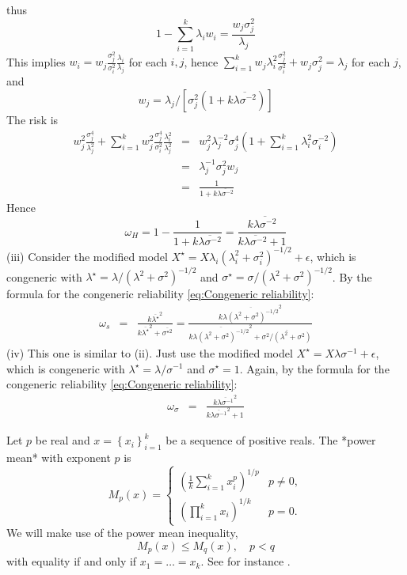 \documentclass{article}
\makeatletter
\theoremstyle{plain}
\theoremstyle{plain}
\theoremstyle{definition}
\theoremstyle{remark}
\theoremstyle{definition}
\theoremstyle{plain}
\theoremstyle{plain}
\theoremstyle{definition}
\newenvironment{proof}[1][\protect\proofname]{\par
	\normalfont\topsep6\p@\@plus6\p@\relax
	\trivlist
	\itemindent\parindent
	\item[\hskip\labelsep\scshape #1]\ignorespaces
}{%
	\endtrivlist\@endpefalse
}
\providecommand{\proofname}{Proof}
\makeatother
\begin{document}
\begin{proof}[Proof of Proposition \ref{prop:Z-reliabiltiy}]
thus 
\[
1-\sum_{i=1}^{k}\lambda_{i}w_{i}=\frac{w_{j}\sigma_{j}^{2}}{\lambda_{j}}
\]
This implies $w_{i}=w_{j}\frac{\sigma_{j}^{2}}{\sigma_{i}^{2}}\frac{\lambda_{i}}{\lambda_{j}}$
for each $i,j$, hence $\sum_{i=1}^{k}w_{j}\lambda_{i}^{2}\frac{\sigma_{j}^{2}}{\sigma_{i}^{2}}+w_{j}\sigma_{j}^{2}=\lambda_{j}$
for each $j$, and
\[
w_{j}=\lambda_{j}/[\sigma_{j}^{2}(1+k\overline{\lambda\sigma^{-2}})]
\]
The risk is
\begin{eqnarray*}
w_{j}^{2}\frac{\sigma_{j}^{4}}{\lambda_{j}^{2}}+\sum_{i=1}^{k}w_{j}^{2}\frac{\sigma_{j}^{4}}{\sigma_{i}^{2}}\frac{\lambda_{i}^{2}}{\lambda_{j}^{2}} & = & w_{j}^{2}\lambda_{j}^{-2}\sigma_{j}^{4}\left(1+\sum_{i=1}^{k}\lambda_{i}^{2}\sigma_{i}^{-2}\right)\\
 & = & \lambda_{j}^{-1}\sigma_{j}^{2}w_{j}\\
 & = & \frac{1}{1+k\overline{\lambda\sigma^{-2}}}
\end{eqnarray*}
Hence
\[
\omega_H = 1 - \frac{1}{1+k\overline{\lambda\sigma^{-2}}} = \frac{k\overline{\lambda\sigma^{-2}}}{k\overline{\lambda\sigma^{-2}}+1}
\]
(iii) Consider the modified
model $X^{\star}=X\lambda_{i}(\lambda_{i}^{2}+\sigma_{i}^{2})^{-1/2}+\epsilon$,
which is congeneric with $\lambda^{\star}=\lambda/(\lambda^{2}+\sigma^{2})^{-1/2}$
and $\sigma^{\star}=\sigma/(\lambda^{2}+\sigma^{2})^{-1/2}$. By the formula for the congeneric reliability \eqref{eq:Congeneric reliability}:
\begin{eqnarray*}
\omega_s & = & \frac{k\overline{\lambda^{\star}}^{2}}{k\overline{\lambda^{\star}}^{2}+\overline{\sigma^{\star2}}} = \frac{k\overline{\lambda(\lambda^{2}+\sigma^{2})^{-1/2}}^{2}}{k\overline{\lambda(\lambda^{2}+\sigma^{2})^{-1/2}}^{2}+\overline{\sigma^{2}/(\lambda^{2}+\sigma^{2})}}
\end{eqnarray*}
(iv) This one is similar to (ii). Just use the modified model $X^{\star}=X\lambda\sigma^{-1}+\epsilon$,
which is congeneric with $\lambda^{\star}=\lambda/\sigma^{-1}$ and
$\sigma^{\star}=1$. Again, by the formula for the congeneric reliability \eqref{eq:Congeneric reliability}:
\begin{eqnarray*}
\omega_\sigma & = & \frac{k\overline{\lambda\sigma^{-1}}^{2}}{k\overline{\lambda\sigma^{-1}}^{2}+1}
\end{eqnarray*}
\end{proof}

Let $p$ be real and $x=\left\{ x_{i}\right\} _{i=1}^{k}$ be a sequence
of positive reals. The *power mean* with exponent $p$ is
\[
M_{p}\left(x\right)=\begin{cases}
\left(\frac{1}{k}\sum_{i=1}^{k}x_{i}^{p}\right)^{1/p} & p\neq0,\\
\left(\prod_{i=1}^{k}x_{i}\right)^{1/k} & p=0.
\end{cases}
\]
We will make use of the power mean inequality,
\begin{equation}
M_{p}\left(x\right)\leq M_{q}\left(x\right),\quad p<q\label{eq:generalized mean inequality}
\end{equation}
with equality if and only if $x_{1}=\ldots=x_{k}$. See for instance \citep[][Chapter III]{Bullen2013-os}.
\end{document}
